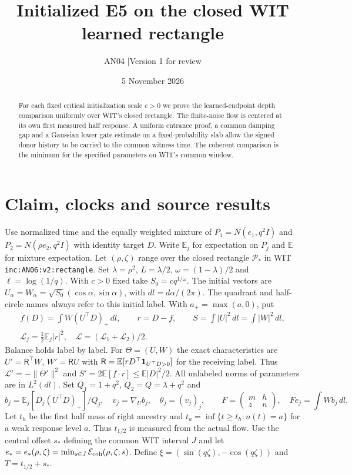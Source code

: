 \documentclass[11pt]{article}
\title{Initialized E5 on the closed WIT learned rectangle}
\author{AN04 \quad|\quad Version 1 for review}
\date{5 November 2026}
\newcommand{\dd}{\,dl}
\newcommand{\Ll}{\mathcal L}
\newcommand{\E}{\mathbb E}
\begin{document}
\maketitle
\begin{abstract}
For each fixed critical initialization scale $c>0$ we prove the learned-endpoint depth comparison uniformly over WIT's closed rectangle. The finite-noise flow is centered at its own first measured half response. A uniform entrance proof, a common damping gap and a Gaussian lower gate estimate on a fixed-probability slab allow the signed donor history to be carried to the common witness time. The coherent comparison is the minimum for the specified parameters on WIT's common window.
\end{abstract}
\section{Claim, clocks and source results}\label{an04e5rv1:setup}
Use normalized time and the equally weighted mixture of $P_1=N(e_1,q^2I)$ and $P_2=N(\rho e_2,q^2I)$ with identity target $D$. Write $\E_j$ for expectation on $P_j$ and $\E$ for mixture expectation.
Let $(\rho,\zeta)$ range over the closed rectangle $\mathcal P_*$ in WIT \texttt{inc:AN06:v2:rectangle}. Set $\lambda=\rho^2$, $L=\lambda/2$, $\omega=(1-\lambda)/2$ and $\ell=\log(1/q)$. With $c>0$ fixed take $S_0=cq^{1/\omega}$. The initial vectors are $U_\alpha=W_\alpha=\sqrt{S_0}(\cos\alpha,\sin\alpha)$, with $dl=d\alpha/(2\pi)$. The quadrant and half-circle names always refer to this initial label. With $a_+=\max(a,0)$, put
\[
 \begin{gathered} f(D)=\int W(U^\top D)_+\dd,\qquad r=D-f,\qquad
 S=\int |U|^2\dd=\int |W|^2\dd,\\
 \Ll_j=\tfrac12\E_j|r|^2,\quad \Ll=(\Ll_1+\Ll_2)/2.\end{gathered}
\]
Balance holds label by label. For $\Theta=(U,W)$ the exact characteristics are
$U'=\mathsf R^\top W$, $W'=\mathsf R U$ with
$\mathsf R=\E[rD^\top{\bf1}_{U^\top D>0}]$ for the receiving label.
Thus $\Ll'=-\|\Theta'\|^2$ and $S'=2\E[f\cdot r]\le \E|D|^2/2$.
All unlabeled norms of parameters are in $L^2(dl)$. Set $Q_1=1+q^2$, $Q_2=Q=\lambda+q^2$ and
\[
 b_j=\E_j[D_j(U^\top D)_+]/Q_j,\quad v_j=\nabla_U b_j,\quad
 \theta_j=(v_j)_j,\qquad
 F=\begin{pmatrix}m&h\\z&n\end{pmatrix},\quad Fe_j=\int W b_j\dd.
\]
Let $t_h$ be the first half mass of right ancestry and $t_a=\inf\{t\ge t_h:n(t)=a\}$ for a weak response level $a$. Thus $t_{1/2}$ is measured from the actual flow. Use the central offset $s_*$ defining the common WIT interval $J$ and let $e_*=e_*(\rho,\zeta)=\min_{s\in J}\mathcal E_{\rm coh}(\rho,\zeta;s)$. Define $\xi=(\sin(q\zeta),-\cos(q\zeta))$ and $T=t_{1/2}+s_*$.
\end{document}
